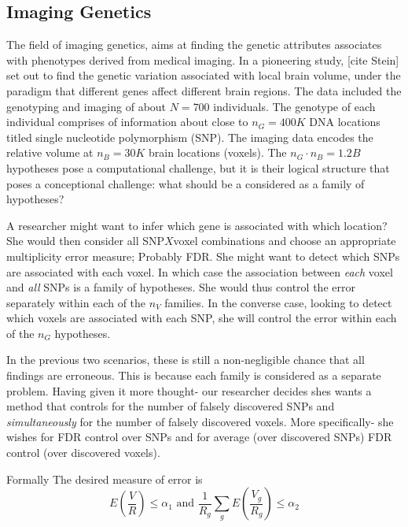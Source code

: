 \documentclass[draft,12pt]{article}
\begin{document}




\subsection{\label{eg:imaging_genetics}Imaging Genetics}
The field of imaging genetics, aims at finding the genetic attributes associates with phenotypes derived from medical imaging. In a pioneering study, [cite Stein] set out to find the genetic variation associated with local brain volume, under the paradigm that different genes affect different brain regions. The data included the genotyping and imaging of about $N=700$ individuals. The genotype of each individual comprises of information about close to $n_G=400K$ DNA locations titled single nucleotide polymorphism (SNP). The imaging data encodes the relative volume at $n_B=30K$ brain locations (voxels). The $n_G \cdot n_B=1.2B$ hypotheses pose a computational challenge, but it is their logical structure that poses a conceptional challenge: what should be a considered as a family of hypotheses?

A researcher might want to infer which gene is associated with which location? She would then consider all SNP$X$voxel combinations and choose an appropriate multiplicity error measure; Probably FDR. 
She might want to detect which SNPs are associated with each voxel. In which case the association between \emph{each} voxel and \emph{all} SNPs is a family of hypotheses. She would thus control the error separately within each of the $n_V$ families. 
In the converse case, looking to detect which voxels are associated with each SNP, she will control the error within each of the $n_G$ hypotheses.


In the previous two scenarios, these is still a non-negligible chance that all findings are erroneous. This is because each family is considered as a separate problem. Having given it more thought- our researcher decides shes wants a method that controls for the number of falsely discovered SNPs and \emph{simultaneously} for the number of falsely discovered voxels. More specifically- she wishes for FDR control over SNPs and for average (over discovered SNPs) FDR control (over discovered voxels). 

Formally The desired measure of error is 
$$E \left(\frac{V}{R} \right)\leq \alpha_1 
\text{ and } 
\frac{1}{R_g}\sum_{g} E \left(\frac{V_g}{R_g} \right)\leq \alpha_2$$

%
\end{document}
